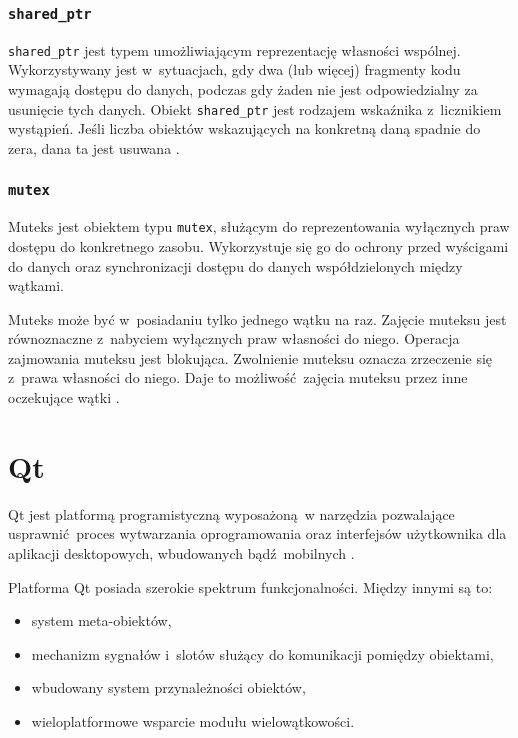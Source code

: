  \subsubsection{\lstinline$shared_ptr$}
\lstinline$shared_ptr$ jest typem umożliwiającym reprezentację własności wspólnej. Wykorzystywany jest w~sytuacjach, gdy dwa (lub więcej) fragmenty kodu wymagają dostępu do danych, podczas gdy żaden nie jest odpowiedzialny za usunięcie tych danych. Obiekt \lstinline$shared_ptr$ jest rodzajem wskaźnika z~licznikiem wystąpień. Jeśli liczba obiektów wskazujących na konkretną daną spadnie do zera, dana ta jest usuwana \cite{Stroustrup}. 

 \subsubsection{\lstinline$mutex$}
Muteks jest obiektem typu \lstinline$mutex$, służącym do reprezentowania wyłącznych praw dostępu do konkretnego zasobu. Wykorzystuje się go do ochrony przed wyścigami do danych oraz synchronizacji dostępu do danych współdzielonych między wątkami.

Muteks może być w~posiadaniu tylko jednego wątku na raz. Zajęcie muteksu jest równoznaczne z~nabyciem wyłącznych praw własności do niego. Operacja zajmowania muteksu jest blokująca. Zwolnienie muteksu oznacza zrzeczenie się z~prawa własności do niego. Daje to możliwość zajęcia muteksu przez inne oczekujące wątki \cite{Stroustrup}.


 \section{Qt}

Qt jest platformą programistyczną wyposażoną w narzędzia pozwalające usprawnić proces wytwarzania oprogramowania oraz interfejsów użytkownika dla aplikacji desktopowych, wbudowanych bądź mobilnych \cite{Qtdoc}.

Platforma Qt posiada szerokie spektrum funkcjonalności. Między innymi są to:
\begin{itemize}
	\item system meta-obiektów,
	\item mechanizm sygnałów i~slotów służący do komunikacji pomiędzy obiektami,
	\item wbudowany system przynależności obiektów,
	\item wieloplatformowe wsparcie modułu wielowątkowości.
		
\end{itemize}

